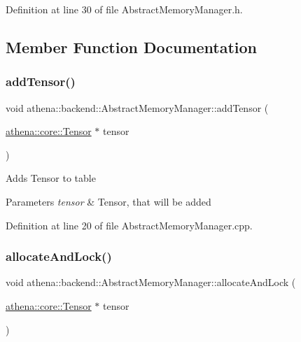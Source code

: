 Definition at line 30 of file Abstract\+Memory\+Manager.\+h.



\subsection{Member Function Documentation}
\mbox{\label{classathena_1_1backend_1_1_abstract_memory_manager_adaa80b617f6f3f19ba5b1ddd2b0377e7}} 
\subsubsection{\texorpdfstring{add\+Tensor()}{addTensor()}}
{\footnotesize\ttfamily void athena\+::backend\+::\+Abstract\+Memory\+Manager\+::add\+Tensor (\begin{DoxyParamCaption}\item[{\mbox{\hyperlink{classathena_1_1core_1_1_tensor}{athena\+::core\+::\+Tensor}} $\ast$}]{tensor }\end{DoxyParamCaption})}

Adds Tensor to table 
\begin{DoxyParams}{Parameters}
{\em tensor} & Tensor, that will be added \\
\hline
\end{DoxyParams}


Definition at line 20 of file Abstract\+Memory\+Manager.\+cpp.

\mbox{\label{classathena_1_1backend_1_1_abstract_memory_manager_ad40a653a8b32410956ba835ca1bb3e5f}} 
\subsubsection{\texorpdfstring{allocate\+And\+Lock()}{allocateAndLock()}\hspace{0.1cm}{\footnotesize\ttfamily [1/3]}}
{\footnotesize\ttfamily void athena\+::backend\+::\+Abstract\+Memory\+Manager\+::allocate\+And\+Lock (\begin{DoxyParamCaption}\item[{\mbox{\hyperlink{classathena_1_1core_1_1_tensor}{athena\+::core\+::\+Tensor}} $\ast$}]{tensor }\end{DoxyParamCaption})}

